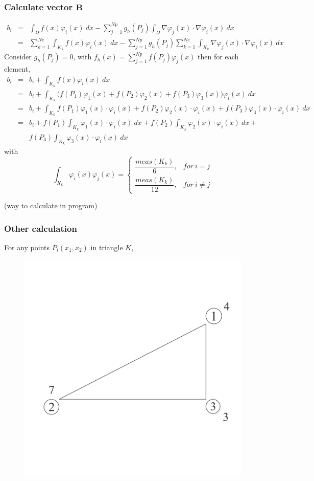 \documentclass[a4paper,10pt]{article}
\begin{document}
\subsubsection{Calculate vector $ \mathbf{B} $}
\begin{eqnarray} \nonumber
b_{i} &=& \int_{\Omega} f(x) \varphi_{i}(x) \ dx - \sum_{j=1}^{Np} g_{h}(P_{j}) \int_{\Omega} \nabla \varphi_{j}(x) \cdot \nabla \varphi_{i}(x) \ dx \\ \nonumber
&=& \sum_{k=1}^{Ne} \int_{K_{k}} f(x) \varphi_{i}(x) \ dx - \sum_{j=1}^{Np} g_{h}(P_{j}) \sum_{k=1}^{Ne} \int_{K_{k}} \nabla \varphi_{j}(x) \cdot \nabla \varphi_{i}(x) \ dx
\end{eqnarray}
Consider $ g_{h}(P_{j}) = 0 $, with $ f_{h}(x) = \sum_{j=1}^{Np} f(P_{j})\varphi_{j}(x) $ then for each element,
\begin{eqnarray} \nonumber
b_{i} &=& b_{i} + \int_{K_{k}} f(x) \varphi_{i}(x) \ dx \\ \nonumber
&=& b_{i} + \int_{K_{k}} \Big( f(P_{1}) \varphi_{1}(x) + f(P_{2}) \varphi_{2}(x) + f(P_{3}) \varphi_{3}(x) \Big) \varphi_{i}(x) \ dx \\ \nonumber
&=& b_{i} + \int_{K_{k}} f(P_{1}) \varphi_{1}(x) \cdot \varphi_{i}(x) + f(P_{2}) \varphi_{2}(x) \cdot \varphi_{i}(x) + f(P_{3}) \varphi_{3}(x) \cdot \varphi_{i}(x) \ dx \\ \nonumber
&=& b_{i} + f(P_{1}) \int_{K_{k}} \varphi_{1}(x) \cdot \varphi_{i}(x) \ dx + f(P_{2}) \int_{K_{k}} \varphi_{2}(x) \cdot \varphi_{i}(x) \ dx + \\ \nonumber
& & f(P_{3}) \int_{K_{k}} \varphi_{3}(x) \cdot \varphi_{i}(x) \ dx
\end{eqnarray}
with
\[  \int_{K_{k}} \varphi_{i}(x) \varphi_{j}(x) = \begin{cases}
\dfrac{meas(K_{k})}{6}, & for \ i=j \\
\dfrac{meas(K_{k})}{12}, & for \ i \neq j 
\end{cases} \]


(way to calculate in program)

\subsubsection{Other calculation}
For any points $ P_{i}(x_{1},x_{2}) $ in triangle $ K $,
\begin{figure}
	\centering
	\includegraphics[width=0.6\linewidth]{picture/triangle}
	\caption{}
	\label{fig:triangle}
\end{figure}
\end{document}
